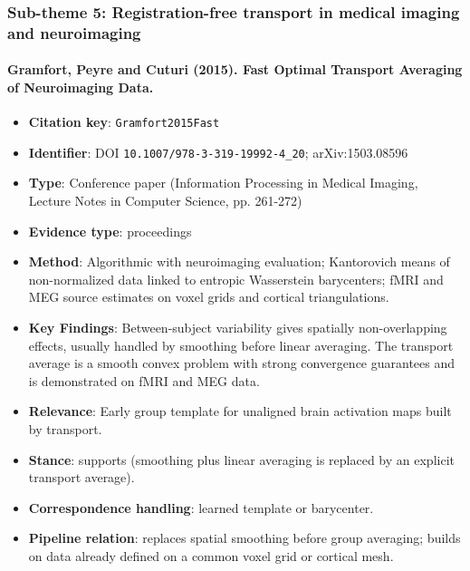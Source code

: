 \documentclass[journal,onecolumn]{IEEEtran}
\begin{document}
\subsubsection{Sub-theme 5: Registration-free transport in medical imaging and neuroimaging}

\paragraph{Gramfort, Peyre and Cuturi (2015). Fast Optimal Transport Averaging of Neuroimaging Data.~\cite{Gramfort2015Fast}}\mbox{}

\begin{itemize}

\item{} \textbf{Citation key}: \texttt{Gramfort2015Fast}

\item{} \textbf{Identifier}: DOI \nolinkurl{10.1007/978-3-319-19992-4_20}; arXiv:1503.08596

\item{} \textbf{Type}: Conference paper (Information Processing in Medical Imaging, Lecture Notes in Computer Science, pp. 261-272)

\item{} \textbf{Evidence type}: proceedings

\item{} \textbf{Method}: Algorithmic with neuroimaging evaluation; Kantorovich means of non-normalized data linked to entropic Wasserstein barycenters; fMRI and MEG source estimates on voxel grids and cortical triangulations.

\item{} \textbf{Key Findings}: Between-subject variability gives spatially non-overlapping effects, usually handled by smoothing before linear averaging. The transport average is a smooth convex problem with strong convergence guarantees and is demonstrated on fMRI and MEG data.

\item{} \textbf{Relevance}: Early group template for unaligned brain activation maps built by transport.

\item{} \textbf{Stance}: supports (smoothing plus linear averaging is replaced by an explicit transport average).

\item{} \textbf{Correspondence handling}: learned template or barycenter.

\item{} \textbf{Pipeline relation}: replaces spatial smoothing before group averaging; builds on data already defined on a common voxel grid or cortical mesh.


\end{itemize}
\end{document}
